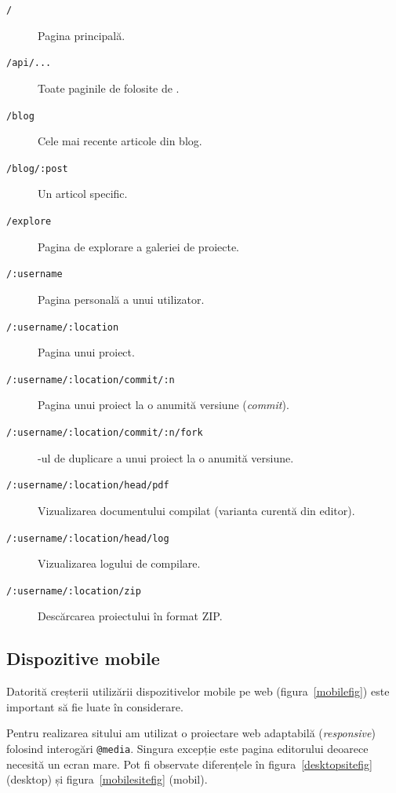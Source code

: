 \documentclass[a4wide,12pt]{report}
\newcommand{\eng}[1]{\emph{#1}} %
\newcommand{\cod}[1]{\texttt{#1}}
\newcommand{\acr}[1]{{\textsmaller[1]{\textsc{#1}}}} %
\begin{document}
\begin{description}

\item[\cod{/}] Pagina principală.

\item[\cod{/api/...}] Toate paginile de folosite de \acr{API}.

\item[\cod{/blog}] Cele mai recente articole din blog.

\item[\cod{/blog/:post}] Un articol specific.

\item[\cod{/explore}] Pagina de explorare a galeriei de proiecte.

\item[\cod{/:username}] Pagina personală a unui utilizator.

\item[\cod{/:username/:location}] Pagina unui proiect.

\item[\cod{/:username/:location/commit/:n}] Pagina unui proiect la o anumită
versiune (\eng{commit}).

\item[\cod{/:username/:location/commit/:n/fork}] \acr{URL}-ul de duplicare a
unui proiect la o anumită versiune.

\item[\cod{/:username/:location/head/pdf}] Vizualizarea documentului compilat
(varianta curentă din editor).

\item[\cod{/:username/:location/head/log}] Vizualizarea logului de compilare.

\item[\cod{/:username/:location/zip}] Descărcarea proiectului în format ZIP.

\end{description}

\subsection{Dispozitive mobile}

Datorită creșterii utilizării dispozitivelor mobile pe web
(figura~\ref{mobilefig}) este important să fie luate în considerare.

Pentru realizarea sitului am utilizat o proiectare web adaptabilă
(\eng{responsive}) folosind interogări \cod{@media}. Singura excepție este
pagina editorului deoarece necesită un ecran mare. Pot fi observate diferențele
în figura~\ref{desktopsitefig} (desktop) și figura~\ref{mobilesitefig} (mobil).
\end{document}
